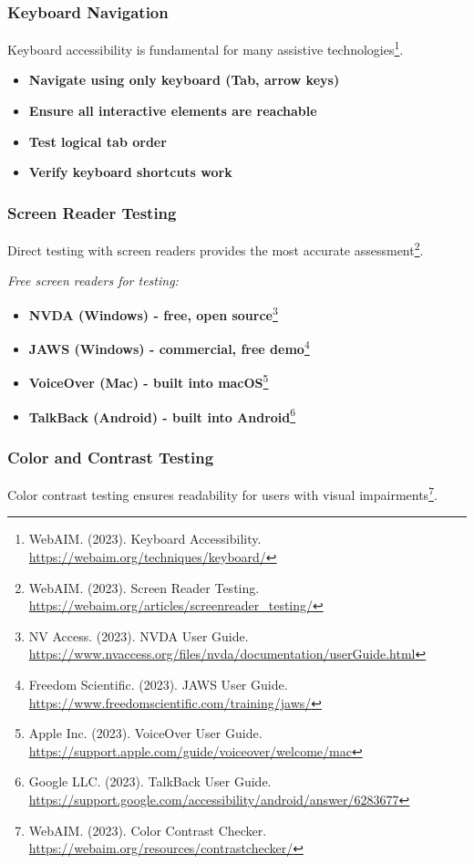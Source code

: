 \subsubsection{Keyboard Navigation}
Keyboard accessibility is fundamental for many assistive technologies\footnote{WebAIM. (2023). Keyboard Accessibility. \url{https://webaim.org/techniques/keyboard/}}.

\begin{itemize}
\item \textbf{Navigate using only keyboard (Tab, arrow keys)}
\item \textbf{Ensure all interactive elements are reachable}
\item \textbf{Test logical tab order}
\item \textbf{Verify keyboard shortcuts work}
\end{itemize}

\subsubsection{Screen Reader Testing}
Direct testing with screen readers provides the most accurate assessment\footnote{WebAIM. (2023). Screen Reader Testing. \url{https://webaim.org/articles/screenreader_testing/}}.

\emph{Free screen readers for testing:}
\begin{itemize}
\item \textbf{NVDA (Windows) - free, open source}\footnote{NV Access. (2023). NVDA User Guide. \url{https://www.nvaccess.org/files/nvda/documentation/userGuide.html}}
\item \textbf{JAWS (Windows) - commercial, free demo}\footnote{Freedom Scientific. (2023). JAWS User Guide. \url{https://www.freedomscientific.com/training/jaws/}}
\item \textbf{VoiceOver (Mac) - built into macOS}\footnote{Apple Inc. (2023). VoiceOver User Guide. \url{https://support.apple.com/guide/voiceover/welcome/mac}}
\item \textbf{TalkBack (Android) - built into Android}\footnote{Google LLC. (2023). TalkBack User Guide. \url{https://support.google.com/accessibility/android/answer/6283677}}
\end{itemize}

\subsubsection{Color and Contrast Testing}
Color contrast testing ensures readability for users with visual impairments\footnote{WebAIM. (2023). Color Contrast Checker. \url{https://webaim.org/resources/contrastchecker/}}.

